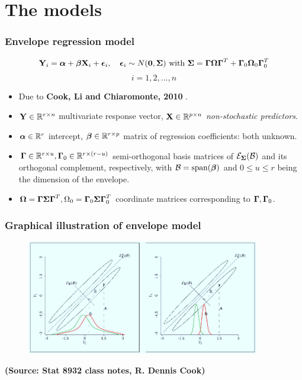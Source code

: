 \documentclass[handout,10pt]{beamer}
\newcommand{\colubf}{\color{UniBlue} \bf}
\begin{document}
\section{The models}

\begin{frame}
\frametitle{Envelope regression model}

$$ {\mathbf{Y}}_i = {\boldsymbol{\alpha}} + {\boldsymbol{\beta}}{\mathbf{X}}_i + {\boldsymbol{\epsilon}}_i,\quad {\boldsymbol{\epsilon}}_i\sim N({\mathbf{0}},{\boldsymbol{\Sigma}}) \mbox{ with }{\boldsymbol{\Sigma}} = {\boldsymbol{\Gamma}}{\boldsymbol{\Omega}}{\boldsymbol{\Gamma}}^T + {\boldsymbol{\Gamma}}_0{\boldsymbol{\Omega}}_0{\boldsymbol{\Gamma}}_0^T$$
$$ i = 1,2,...,n $$
\begin{itemize}
\item Due to {\colubf Cook, Li and Chiaromonte, 2010} \cite{cook}.
\vspace{.2cm}
\item ${\mathbf{Y}}\in{\mathbb{R}}^{r\times n}$ multivariate response vector, ${\mathbf{X}}\in{\mathbb{R}}^{p\times n}$ \textit{non-stochastic predictors}.
\item ${\boldsymbol{\alpha}}\in{\mathbb{R}}^r$ intercept, ${\boldsymbol{\beta}}\in{\mathbb{R}}^{r\times p}$ matrix of regression coefficients: both unknown.
\item ${\boldsymbol{\Gamma}}\in{\mathbb{R}}^{r\times u},{\boldsymbol{\Gamma}}_0\in{\mathbb{R}}^{r\times (r-u)}$ semi-orthogonal basis matrices of ${\cal{E}}_{\boldsymbol{\Sigma}}({\cal{B}})$ and its orthogonal complement, respectively, with ${\cal{B}} = \mbox{span}({\boldsymbol{\beta}})$ and $0\leq u\leq r$ being the dimension of the envelope.
\item ${\boldsymbol{\Omega}} = {\boldsymbol{\Gamma}}{\boldsymbol{\Sigma}}{\boldsymbol{\Gamma}}^T, \Omega_0 = {\boldsymbol{\Gamma}}_0{\boldsymbol{\Sigma}}{\boldsymbol{\Gamma}}_0^T$ coordinate matrices corresponding to ${\boldsymbol{\Gamma}}, {\boldsymbol{\Gamma}}_0$.
\end{itemize}
\end{frame}

\begin{frame}
\frametitle{Graphical illustration of envelope model}
\begin{figure}\begin{center}
   \includegraphics[height=5cm]{env.png}
   \label{fig:fig1}
\end{center}\end{figure}
\begin{center}
{\colubf (Source: Stat 8932 class notes, R. Dennis Cook)}
\end{center}
\end{frame}
\end{document}
